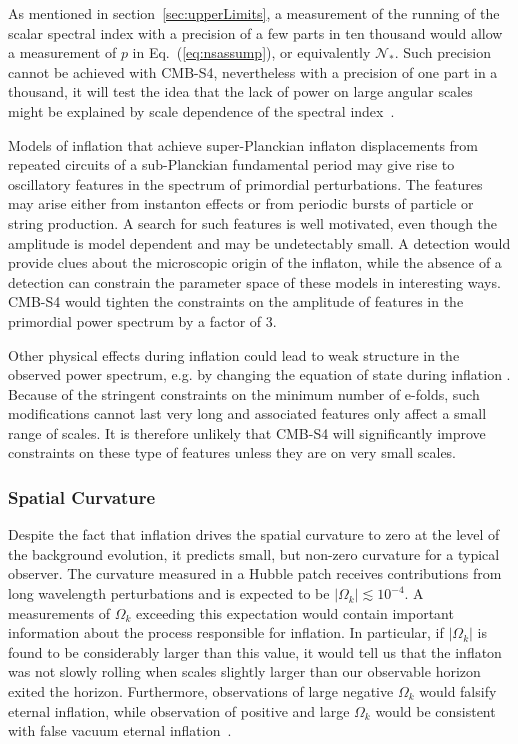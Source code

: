 As mentioned in section~\ref{sec:upperLimits}, a measurement of the running of the scalar spectral index with a precision of a few parts in ten thousand would allow a measurement of $p$ in Eq.~(\ref{eq:nsassump}), or equivalently $\mathcal{N}_\ast$. Such precision cannot be achieved with CMB-S4, nevertheless with a precision of one part in a thousand, it will test the idea that the lack of power on large angular scales might be explained by scale dependence of the spectral index~\cite{Meerburg:2014bpa}.  

Models of inflation that achieve super-Planckian inflaton displacements from repeated circuits of a sub-Planckian fundamental period may give rise to oscillatory features in the spectrum of primordial perturbations. The features may arise either from instanton effects or from periodic bursts of particle or string production. A search for such features is well motivated, even though the amplitude is model dependent and may be undetectably small. A detection would provide clues about the microscopic origin of the inflaton, while the absence of a detection can constrain the parameter space of these models in interesting ways. CMB-S4 would tighten the constraints on the amplitude of features in the primordial power spectrum by a factor of 3. 

Other physical effects during inflation could lead to weak structure in the observed power spectrum, e.g. by changing the equation of state during inflation \cite{Achucarro:2014msa}. Because of the stringent constraints on the minimum number of e-folds, such modifications cannot last very long and associated features only affect a small range of scales. It is therefore unlikely that CMB-S4 will significantly improve constraints on these type of features unless they are on very small scales. 

\subsubsection{Spatial Curvature}
\label{sec:curvature}

Despite the fact that inflation drives the spatial curvature to zero at the level of the background evolution, it predicts small, but non-zero curvature for a typical observer. The curvature measured in a Hubble patch receives contributions from long wavelength perturbations and is expected to be $|\Omega_k|\lesssim10^{-4}$. A measurements of $\Omega_k$ exceeding this expectation would contain important information about the process responsible for inflation. In particular, if $|\Omega_k|$ is found to be considerably larger than this value, it would tell us that the inflaton was not slowly rolling when scales slightly larger than our observable horizon exited the horizon. Furthermore, observations of large negative $\Omega_k$ would falsify eternal inflation, while observation of positive and large $\Omega_k$ would be consistent with false vacuum eternal inflation~\cite{Guth:2012ww,Kleban:2012ph}.

